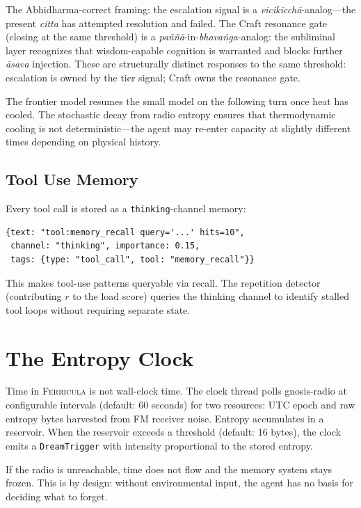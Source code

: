 \documentclass[twocolumn,10pt]{article}
\begin{document}
The Abhidharma-correct framing: the escalation signal is a
\textit{vicik\=icch\=a}-analog---the present \textit{citta} has attempted
resolution and failed.  The Craft resonance gate (closing at the same
threshold) is a \textit{pa\~n\~n\=a}-in-\textit{bhava\.nga}-analog: the
subliminal layer recognizes that wisdom-capable cognition is warranted and
blocks further \textit{\=asava} injection.  These are structurally distinct
responses to the same threshold: escalation is owned by the tier signal;
Craft owns the resonance gate.

The frontier model resumes the small model on the following turn once
heat has cooled.  The stochastic decay from radio entropy ensures that
thermodynamic cooling is not deterministic---the agent may re-enter
capacity at slightly different times depending on physical history.

\subsection{Tool Use Memory}

Every tool call is stored as a \texttt{thinking}-channel memory:

\begin{lstlisting}
{text: "tool:memory_recall query='...' hits=10",
 channel: "thinking", importance: 0.15,
 tags: {type: "tool_call", tool: "memory_recall"}}
\end{lstlisting}

\noindent
This makes tool-use patterns queryable via recall.  The repetition
detector (contributing $r$ to the load score) queries the thinking channel
to identify stalled tool loops without requiring separate state.

\section{The Entropy Clock}

Time in \textsc{Ferricula} is not wall-clock time.  The clock thread
polls gnosis-radio at configurable intervals (default: 60 seconds)
for two resources: UTC epoch and raw entropy bytes harvested from
FM receiver noise.  Entropy accumulates in a reservoir.  When the
reservoir exceeds a threshold (default: 16 bytes), the clock emits
a \texttt{DreamTrigger} with intensity proportional to the stored
entropy.

If the radio is unreachable, time does not flow and the memory
system stays frozen.  This is by design: without environmental
input, the agent has no basis for deciding what to forget.
\end{document}
